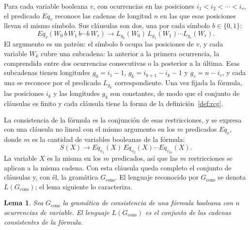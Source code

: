 \documentclass{report}
\theoremstyle{definition}
\theoremstyle{plain}
\newtheorem{lema}{Lema}[chapter]
\theoremstyle{remark}
\begin{document}
Para cada variable booleana $v$, con ocurrencias en las posiciones
$i_1 < i_2 < \cdots < i_r$, el predicado $Eq_v$ reconoce las cadenas de
longitud $n$ en las que esas posiciones llevan el mismo símbolo. Sus
cláusulas son dos, una por cada símbolo $b \in \{0,1\}$:
\[
  Eq_v(W_0\, b\, W_1\, b \cdots b\, W_r) \to
  L_{g_0}(W_0)\, L_{g_1}(W_1) \cdots L_{g_r}(W_r).
\]
El argumento es un patrón: el símbolo $b$ ocupa las posiciones de $v$, y
cada variable $W_k$ cubre una subcadena: la anterior a la primera
ocurrencia, la comprendida entre dos ocurrencias consecutivas o la
posterior a la última. Esas subcadenas tienen longitudes
$g_0 = i_1 - 1$, $g_k = i_{k+1} - i_k - 1$ y $g_r = n - i_r$, y cada
una se reconoce por el predicado $L_{g_k}$ correspondiente. Una vez
fijada la fórmula, las posiciones $i_k$ y las longitudes $g_k$ son
constantes, de modo que el conjunto de cláusulas es finito y cada
cláusula tiene la forma de la definición~\ref{def:rcg}.

La consistencia
de la fórmula es la conjunción de esas restricciones, y se expresa con
una cláusula no lineal con el mismo argumento en los $m$ predicados
$Eq_v$, donde $m$ es la cantidad de variables booleanas de la fórmula:
\[
  S(X) \to Eq_{v_1}(X)\, Eq_{v_2}(X) \cdots Eq_{v_m}(X).
\]
La variable $X$ es la misma en los $m$ predicados, así que las $m$
restricciones se aplican a la misma cadena. Con esta cláusula queda
completo el conjunto de cláusulas y, con él, la gramática
$G_{\mathrm{cons}}$. El lenguaje reconocido por $G_{\mathrm{cons}}$ se
denota $L(G_{\mathrm{cons}})$; el lema siguiente lo caracteriza.

\begin{lema}
\label{lema:lenguaje-gcons}
Sea $G_{\mathrm{cons}}$ la gramática de consistencia de una fórmula
booleana con $n$ ocurrencias de variable. El lenguaje
$L(G_{\mathrm{cons}})$ es el conjunto de las cadenas consistentes de
la fórmula.
\end{lema}
\end{document}
